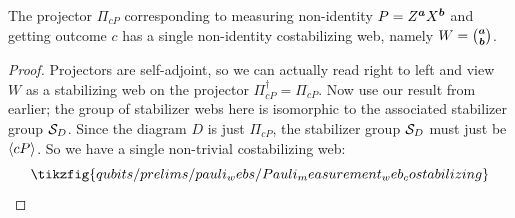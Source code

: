 \begin{lemma}\label{lem:only_costabilizing_web_on_pauli_measurement}
    The projector $\Pi_{cP}$ corresponding to measuring non-identity $P = Z^{\boldsymbol{a}}X^{\boldsymbol{b}}$ and getting outcome $c$ has a single non-identity costabilizing web, namely $W = \tbinom{\boldsymbol{a}}{\boldsymbol{b}}$.
    \begin{proof}
        Projectors are self-adjoint, so we can actually read right to left and view $W$ as a stabilizing web on the projector $\Pi_{cP}^\dagger = \Pi_{cP}$.
        Now use our result from  earlier; the group of stabilizer webs here is isomorphic to the associated stabilizer group $\mathcal{S}_D$.
        Since the diagram $D$ is just $\Pi_{cP}$, the stabilizer group $\mathcal{S}_D$ must just be $\langle cP \rangle$.
        So we have a single non-trivial costabilizing web:
        \begin{equation}
            \tikzfig{qubits/prelims/pauli_webs/Pauli_measurement_web_costabilizing}
        \end{equation}
    \end{proof}
\end{lemma}

%
%
%
%
%


